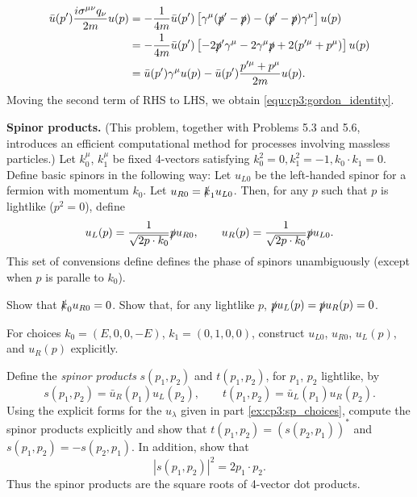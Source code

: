 \solution
\begin{align*}
    \bar{u}(p')\frac{i\sigma^{\mu\nu}q_\nu}{2m} u(p) 
    & = -\frac{1}{4m} \bar{u}(p') \left[\gamma^\mu(\slashed{p}' - \slashed{p}) - (\slashed{p}' - \slashed p) \gamma^\mu \right] u(p)\\
    & = -\frac{1}{4m} \bar{u}(p') \left[-2\slashed{p}'\gamma^\mu - 2\gamma^\mu\slashed{p} + 2(p'^\mu + p^\mu) \right] u(p)\\
    & = \bar{u}(p')\gamma^\mu u(p) - \bar{u}(p')\frac{p'^\mu + p^\mu}{2m}u(p).
\end{align*}
Moving the second term of RHS to LHS, we obtain \eqref{equ:cp3:gordon_identity}.

\problem \textbf{Spinor products.} (This problem, together with Problems 5.3 and 5.6, introduces an efficient computational method for
processes involving massless particles.) Let $k_0^\mu$, $k_1^\mu$ be fixed 4-vectors satisfying $k_0^2 = 0, k_1^2 = -1, k_0\cdot k_1 = 0$.
Define basic spinors in the following way: Let $u_{L0}$ be the left-handed spinor for a fermion with momentum $k_0$. Let $u_{R0} = \slashed{k}_1 u_{L0}$.
Then, for any $p$ such that $p$ is lightlike ($p^2 = 0$), define
\begin{equation*}
    u_L(p) = \frac{1}{\sqrt{2p\cdot k_0}} \slashed{p} u_{R0}, \qquad u_R(p) = \frac{1}{\sqrt{2p\cdot k_0}}  \slashed{p} u_{L0}.
\end{equation*}
This set of convensions define defines the phase of spinors unambiguously (except when $p$ is paralle to $k_0$).
\begin{problembody}
    \item Show that $\slashed{k}_0 u_{R0} = 0$. Show that, for any lightlike $p$, $\slashed{p}u_L(p) = \slashed{p}u_R(p) = 0$.
    \item \label{ex:cp3:sp_choices} For choices $k_0 = (E, 0, 0, -E)$, $k_1 = (0, 1, 0, 0)$, construct $u_{L0}$, $u_{R0}$, $u_L(p)$, and $u_R(p)$ explicitly.
    \item Define the \textit{spinor products} $s(p_1, p_2)$ and $t(p_1, p_2)$, for $p_1$, $p_2$ lightlike, by
    \begin{equation*}
        s(p_1, p_2) = \bar{u}_R(p_1) u_L(p_2), \qquad t(p_1, p_2) = \bar{u}_L(p_1) u_R(p_2).
    \end{equation*}
    Using the explicit forms for the $u_\lambda$ given in part \ref{ex:cp3:sp_choices}, compute the spinor products explicitly and show that
    $t(p_1, p_2) = (s(p_2, p_1))^\ast$ and $s(p_1, p_2) = -s(p_2, p_1)$. In addition, show that
    \begin{equation*}
        \left| s(p_1, p_2) \right|^2 = 2p_1 \cdot p_2.
    \end{equation*}
    Thus the spinor products are the square roots of 4-vector dot products.
\end{problembody}

